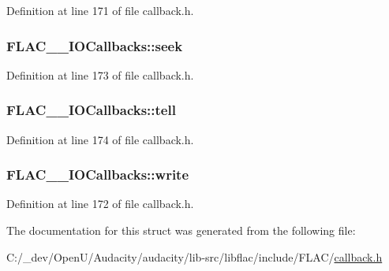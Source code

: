 Definition at line 171 of file callback.\+h.

\subsubsection[{\texorpdfstring{seek}{seek}}]{ F\+L\+A\+C\+\_\+\+\_\+\+I\+O\+Callbacks\+::seek}\hypertarget{struct_f_l_a_c_____i_o_callbacks_aa1a6f4623965a2d9fcc09b92fabaa1ee}{}\label{struct_f_l_a_c_____i_o_callbacks_aa1a6f4623965a2d9fcc09b92fabaa1ee}


Definition at line 173 of file callback.\+h.

\subsubsection[{\texorpdfstring{tell}{tell}}]{ F\+L\+A\+C\+\_\+\+\_\+\+I\+O\+Callbacks\+::tell}\hypertarget{struct_f_l_a_c_____i_o_callbacks_a8ff0d175a7b3e9318270e305918df827}{}\label{struct_f_l_a_c_____i_o_callbacks_a8ff0d175a7b3e9318270e305918df827}


Definition at line 174 of file callback.\+h.

\subsubsection[{\texorpdfstring{write}{write}}]{ F\+L\+A\+C\+\_\+\+\_\+\+I\+O\+Callbacks\+::write}\hypertarget{struct_f_l_a_c_____i_o_callbacks_ad64901e5a5710ee4c3c157c75d51ddc0}{}\label{struct_f_l_a_c_____i_o_callbacks_ad64901e5a5710ee4c3c157c75d51ddc0}


Definition at line 172 of file callback.\+h.



The documentation for this struct was generated from the following file\+:\begin{DoxyCompactItemize}
\item 
C\+:/\+\_\+dev/\+Open\+U/\+Audacity/audacity/lib-\/src/libflac/include/\+F\+L\+A\+C/\hyperlink{callback_8h}{callback.\+h}\end{DoxyCompactItemize}
